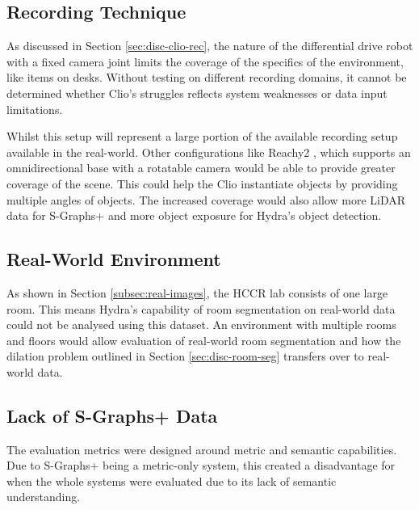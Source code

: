 \subsection{Recording Technique}\label{sec:lim:recording-style}

As discussed in Section \ref{sec:disc-clio-rec}, the nature of the differential drive robot with a fixed camera joint limits the coverage of the specifics of the environment, like items on desks. Without testing on different recording domains, it cannot be determined whether Clio’s struggles reflects system weaknesses or data input limitations.

Whilst this setup will represent a large portion of the available recording setup available in the real-world. Other configurations like Reachy2 \cite{Reachy2}, which supports an omnidirectional base with a rotatable camera would be able to provide greater coverage of the scene. This could help the Clio instantiate objects by providing multiple angles of objects. The increased coverage would also allow more LiDAR data for S-Graphs+ and more object exposure for Hydra’s object detection.

\subsection{Real-World Environment}\label{sec:lim:environment}

As shown in Section \ref{subsec:real-images}, the HCCR lab consists of one large room. This means Hydra’s capability of room segmentation on real-world data could not be analysed using this dataset. An environment with multiple rooms and floors would allow evaluation of real-world room segmentation and how the dilation problem outlined in Section \ref{sec:disc-room-seg} transfers over to real-world data.

\subsection{Lack of S-Graphs+ Data}\label{sec:lim:sgraphs}

The evaluation metrics were designed around metric and semantic capabilities. Due to S-Graphs+ being a metric-only system, this created a disadvantage for when the whole systems were evaluated due to its lack of semantic understanding.



